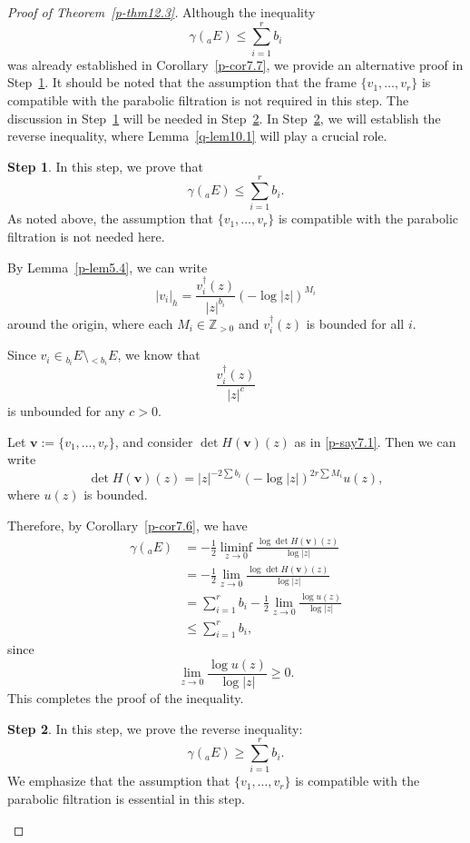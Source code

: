 \documentclass[12pt,twoside]{amsart}
\theoremstyle{definition}
\newtheorem{step}{Step}
\begin{document}
\begin{proof}[Proof of Theorem~\ref{p-thm12.3}] 
Although the inequality
\[
\gamma({}_a E) \leq \sum_{i=1}^r b_i
\]
was already established in Corollary~\ref{p-cor7.7}, 
we provide an alternative proof in Step~\ref{p-step12.3-1}.  
It should be noted that the assumption that the frame 
$\{v_1, \ldots, v_r\}$ is compatible with the parabolic 
filtration is not required in this step.  
The discussion in Step~\ref{p-step12.3-1} will be needed 
in Step~\ref{p-step12.3-2}.  
In Step~\ref{p-step12.3-2}, we will establish the 
reverse inequality, where Lemma~\ref{q-lem10.1} will play a crucial role.

\setcounter{step}{0}
\begin{step}\label{p-step12.3-1}
In this step, we prove that
\[
\gamma({}_a E) \leq \sum_{i=1}^r b_i.
\]
As noted above, the assumption 
that $\{v_1, \ldots, v_r\}$ is compatible 
with the parabolic filtration is not needed here.

By Lemma~\ref{p-lem5.4}, we can write
\[
|v_i|_h = \frac{v^\dag_i(z)}{|z|^{b_i}} \left(-\log |z|\right)^{M_i}
\]
around the origin, where each $M_i \in \mathbb{Z}_{>0}$ and $v^\dag_i(z)$ is bounded for all $i$.

Since $v_i \in {}_{b_i}E \setminus {}_{< b_i} E$, we know that
\[
\frac{v^\dag_i(z)}{|z|^c}
\]
is unbounded for any $c > 0$.

Let $\bm{v} := \{v_1, \ldots, v_r\}$, and consider $\det H(\bm{v})(z)$ as in \ref{p-say7.1}.  
Then we can write
\[
\det H(\bm{v})(z) = |z|^{-2\sum b_i} \left(-\log |z|\right)^{2r \sum M_i} u(z),
\]
where $u(z)$ is bounded.

Therefore, by Corollary~\ref{p-cor7.6}, we have
\[
\begin{split}
\gamma({}_a E) &= -\frac{1}{2} \liminf_{z \to 0} \frac{\log \det H(\bm{v})(z)}{\log |z|} \\
&= -\frac{1}{2} \lim_{z \to 0} \frac{\log \det H(\bm{v})(z)}{\log |z|} \\
&= \sum_{i=1}^r b_i - \frac{1}{2} \lim_{z \to 0} \frac{\log u(z)}{\log |z|} \\
&\leq \sum_{i=1}^r b_i,
\end{split}
\]
since
\[
\lim_{z \to 0} \frac{\log u(z)}{\log |z|} \geq 0.
\]
This completes the proof of the inequality.
\end{step}

\begin{step}\label{p-step12.3-2}
In this step, we prove the reverse inequality:
\[
\gamma({}_a E) \geq \sum_{i=1}^r b_i.
\]
We emphasize that the 
assumption that $\{v_1, \ldots, v_r\}$ is 
compatible with the parabolic filtration is essential in 
this step.


\end{step}
\end{proof}
\end{document}
